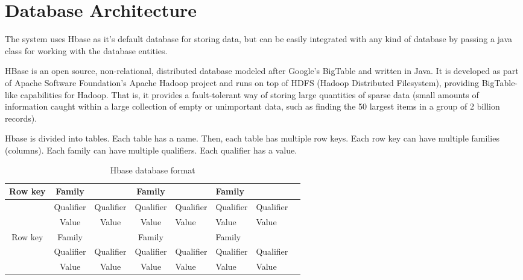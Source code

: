 \chapter{Database Architecture}
\label{chapter:database-architecture}
The system uses Hbase as it’s default database for storing data, but can be easily integrated with any kind of database by passing a java class for working with the database entities.

HBase is an open source, non-relational, distributed database modeled after Google's BigTable and written in Java. It is developed as part of Apache Software Foundation's Apache Hadoop project and runs on top of HDFS (Hadoop Distributed Filesystem), providing BigTable-like capabilities for Hadoop. That is, it provides a fault-tolerant way of storing large quantities of sparse data (small amounts of information caught within a large collection of empty or unimportant data, such as finding the 50 largest items in a group of 2 billion records).

Hbase is divided into tables. Each table has a name. Then, each table has multiple row keys. Each row key can have multiple families (columns). Each family can have multiple qualifiers. Each qualifier has a value.

\begin{table}[h]
  \caption{Hbase database format}
\centering
\begin{tabular}{@{}ccccllll@{}}

Row key                & Family                         &                                & Family                         &                                & Family    &           \\ \toprule 
& Qualifier                      & Qualifier                      & Qualifier                      & Qualifier                      & Qualifier & Qualifier \\ 
                       & Value                          & Value                          & Value                          & Value                          & Value     & Value     \\ 
Row key                & Family                         &                                & Family                         &                                & Family    &           \\ \toprule 
 & Qualifier & Qualifier & Qualifier & Qualifier & Qualifier & Qualifier \\ 
 & Value     & Value     & Value     & Value     & Value     & Value     \\ 
\end{tabular}
\end{table}

